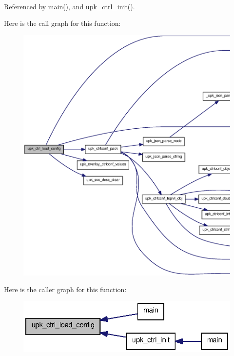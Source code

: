 Referenced by main(), and upk\_\-ctrl\_\-init().



Here is the call graph for this function:
\nopagebreak
\begin{figure}[H]
\begin{center}
\leavevmode
\includegraphics[width=400pt]{group__config__impl_ga11c5a55e854fb56c864a12ef5d314798_cgraph}
\end{center}
\end{figure}




Here is the caller graph for this function:
\nopagebreak
\begin{figure}[H]
\begin{center}
\leavevmode
\includegraphics[width=330pt]{group__config__impl_ga11c5a55e854fb56c864a12ef5d314798_icgraph}
\end{center}
\end{figure}


